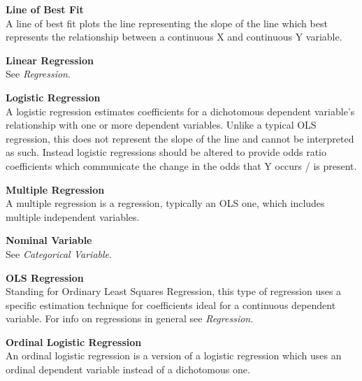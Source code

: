 \documentclass[12pt,letterpaper]{article}
\begin{document}
\vspace{1em}

\textbf{Line of Best Fit}\\
A line of best fit plots the line representing the slope of the line which best represents the relationship between a continuous X and continuous Y variable.

\vspace{1em}

\textbf{Linear Regression}\\
See \textit{Regression}.

\vspace{1em}

\textbf{Logistic Regression}\\
A logistic regression estimates coefficients for a dichotomous dependent variable's relationship with one or more dependent variables. Unlike a typical OLS regression, this does not represent the slope of the line and cannot be interpreted as such. Instead logistic regressions should be altered to provide odds ratio coefficients which communicate the change in the odds that Y occurs / is present.

\vspace{1em}

\textbf{Multiple Regression}\\
A multiple regression is a regression, typically an OLS one, which includes multiple independent variables. 

\vspace{1em}

\textbf{Nominal Variable}\\
See \textit{Categorical Variable}.

\vspace{1em}

\textbf{OLS Regression}\\
Standing for Ordinary Least Squares Regression, this type of regression uses a specific estimation technique for coefficients ideal for a continuous dependent variable. For info on regressions in general see \textit{Regression}.

\vspace{1em}

\textbf{Ordinal Logistic Regression}\\
An ordinal logistic regression is a version of a logistic regression which uses an ordinal dependent variable instead of a dichotomous one.

\vspace{1em}
\end{document}
